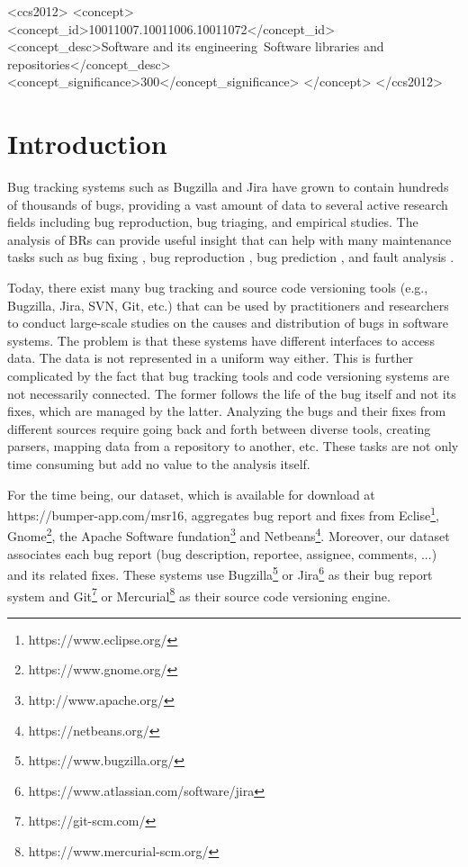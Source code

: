 \documentclass{sig-alternate-05-2015}
\begin{document}
\begin{CCSXML}
<ccs2012>
<concept>
<concept_id>10011007.10011006.10011072</concept_id>
<concept_desc>Software and its engineering~Software libraries and repositories</concept_desc>
<concept_significance>300</concept_significance>
</concept>
</ccs2012>
\end{CCSXML}


\printccsdesc



\section{Introduction}
\label{sec:Introduction}

Bug tracking systems such as Bugzilla and Jira have
grown to contain hundreds of thousands of bugs, providing
a vast amount of data to several active research fields
including bug reproduction, bug triaging, and empirical
studies. The analysis of BRs can provide useful insight that
can help with many maintenance tasks such as bug fixing
\cite{Weiß2007, Bhattacharya2011, Saha2014}, bug reproduction \cite{Artzi2008,Chen2013,Jin2012,Nayrolles2015}, bug prediction \cite{DAmbros2010, Kamei2010, Kim2011a}, and fault analysis \cite{Hamill2014}.

Today, there exist many bug tracking and source code
versioning tools (e.g., Bugzilla, Jira, SVN, Git, etc.) that
can be used by practitioners and researchers to conduct
large-scale studies on the causes and distribution of bugs in
software systems. The problem is that these systems have
different interfaces to access data. The data is not
represented in a uniform way either. This is further
complicated by the fact that bug tracking tools and code
versioning systems are not necessarily connected. The
former follows the life of the bug itself and not its fixes,
which are managed by the latter.
Analyzing the bugs and their fixes from different
sources require going back and forth between diverse tools,
creating parsers, mapping data from a repository to another,
etc. These tasks are not only time consuming but add no
value to the analysis itself.

For the time being, our dataset, which is available for download at
https://bumper-app.com/msr16, aggregates bug report and fixes from
Eclise\footnote{https://www.eclipse.org/}, Gnome\footnote{https://www.gnome.org/}, the Apache Software fundation\footnote{http://www.apache.org/} and Netbeans\footnote{https://netbeans.org/}.
Moreover, our dataset associates each bug report (bug description, reportee, assignee, comments, ...) and its related fixes.
These systems use Bugzilla\footnote{https://www.bugzilla.org/} or Jira\footnote{https://www.atlassian.com/software/jira} as their bug report system and Git\footnote{https://git-scm.com/} or Mercurial\footnote{https://www.mercurial-scm.org/} as their source code versioning engine.
\end{document}
